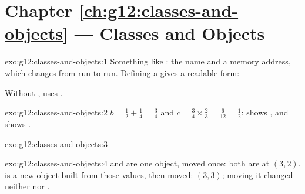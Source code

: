 \section*{Chapter \ref{ch:g12:classes-and-objects} --- Classes and Objects}

\begin{solution}{exo:g12:classes-and-objects:1}
Something like : the  name and a memory address, which changes from
run to run. Defining a  gives a readable form:

\smallskip\noindent\hspace*{2em}

\noindent\hspace*{4em}

\smallskip\noindent Without ,  uses .
\end{solution}

\begin{solution}{exo:g12:classes-and-objects:2}
$b = \frac12 + \frac14 = \frac34$ and $c = \frac34 \times \frac23 = \frac{6}{12} = \frac12$:  shows
, and  shows .
\end{solution}

\begin{solution}{exo:g12:classes-and-objects:3}
\smallskip\noindent\hspace*{2em}

\noindent\hspace*{4em}

\noindent\hspace*{6em}

\noindent\hspace*{4em}

\noindent\hspace*{6em}

\noindent\hspace*{4em}

\noindent\hspace*{6em}
\end{solution}

\begin{solution}{exo:g12:classes-and-objects:4}
 and  are one object, moved once: both are at $(3, 2)$.  is a new object built from those
values, then moved: $(3, 3)$; moving it changed neither  nor .
\end{solution}

